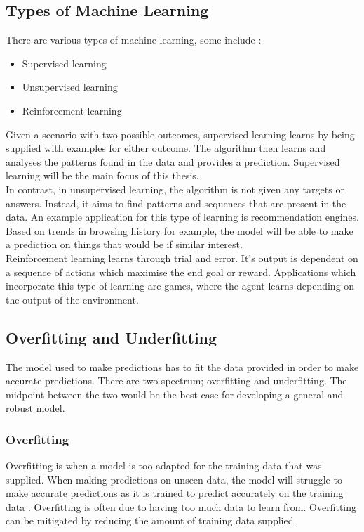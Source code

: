 \subsection{Types of Machine Learning}
There are various types of machine learning, some include \cite{ref:ml_1}:
\begin{itemize}
	\item Supervised learning
	\item Unsupervised learning
	\item Reinforcement learning
\end{itemize}

Given a scenario with two possible outcomes, supervised learning learns by being supplied with examples for either outcome. The algorithm then learns and analyses the patterns found in the data and provides a prediction. Supervised learning will be the main focus of this thesis.
\\[1\baselineskip]
In contrast, in unsupervised learning, the algorithm is not given any targets or answers. Instead, it aims to find patterns and sequences that are present in the data. An example application for this type of learning is recommendation engines. Based on trends in browsing history for example, the model will be able to make a prediction on things that would be if similar interest.
\\[1\baselineskip]
Reinforcement learning learns through trial and error. It's output is dependent on a sequence of actions which maximise the end goal or reward. Applications which incorporate this type of learning are games, where the agent learns depending on the output of the environment.

\subsection{Overfitting and Underfitting}
The model used to make predictions has to fit the data provided in order to make accurate predictions. There are two spectrum; overfitting and underfitting. The midpoint between the two would be the best case for developing a general and robust model. 
\subsubsection{Overfitting}
Overfitting is when a model is too adapted for the training data that was supplied. When making predictions on unseen data, the model will struggle to make accurate predictions as it is trained to predict accurately on the training data \cite{ref:ml_1}. Overfitting is often due to having too much data to learn from. Overfitting can be mitigated by reducing the amount of training data supplied. 


